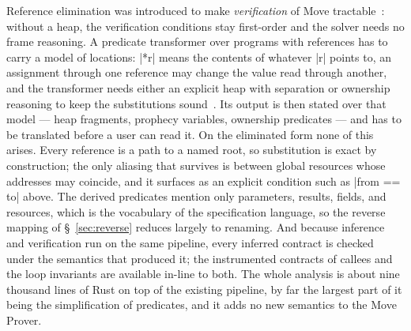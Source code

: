 Reference elimination was introduced to make \emph{verification} of Move tractable~\cite{DillGPQXZ22}: without a heap, the verification conditions stay first-order and the solver needs no frame reasoning.
A predicate transformer over programs with references has to carry a model of locations: |*r| means the contents of whatever |r| points to, an assignment through one reference may change the value read through another, and the transformer needs either an explicit heap with separation or ownership reasoning to keep the substitutions sound~\cite{RustHorn,Aeneas}.
Its output is then stated over that model --- heap fragments, prophecy variables, ownership predicates --- and has to be translated before a user can read it.
On the eliminated form none of this arises.
Every reference is a path to a named root, so substitution is exact by construction; the only aliasing that survives is between global resources whose addresses may coincide, and it surfaces as an explicit condition such as |from == to| above.
The derived predicates mention only parameters, results, fields, and resources, which is the vocabulary of the specification language, so the reverse mapping of \S~\ref{sec:reverse} reduces largely to renaming.
And because inference and verification run on the same pipeline, every inferred contract is checked under the semantics that produced it; the instrumented contracts of callees and the loop invariants are available in-line to both.
The whole analysis is about nine thousand lines of Rust on top of the existing pipeline, by far the largest part of it being the simplification of predicates, and it adds no new semantics to the Move Prover.

